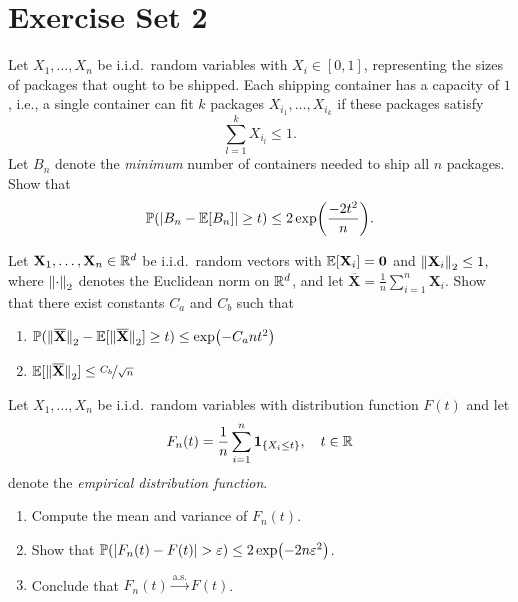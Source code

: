 \section{Exercise Set 2}

\begin{exercise}
Let $X_1, \dots, X_n$ be i.i.d.\ random variables with $X_i \in [0,1]$, representing the sizes of packages that ought to be shipped. Each shipping container has a capacity of $1$, i.e., a single container can fit $k$ packages $X_{i_1}, \dots, X_{i_k}$ if these packages satisfy
\[
    \sum_{l=1}^k X_{i_l} \leq 1.
\]
Let $B_n$ denote the \emph{minimum} number of containers needed to ship all $n$ packages. Show that
\[
    \operatorname{\mathbb{P}}(\abs{B_n - \operatorname{\mathbb{E}}[B_n]} \geq t) \leq 2 \exp(\frac{-2t^2}{n}).
\]
\end{exercise}


\begin{exercise}
Let $\mathbf{X}_1, \dots, \mathbf{X}_n \in \mathbb{R}^d$ be i.i.d.\ random vectors with $\operatorname{\mathbb{E}}[\mathbf{X}_i] = \mathbf{0}$ and $\norm{\mathbf{X}_i}_2 \leq 1$, where $\norm{\cdot}_2$ denotes the Euclidean norm on $\mathbb{R}^d$, and let $\overline{\mathbf{X}} = \frac{1}{n} \sum_{i=1}^n \mathbf{X}_i$. Show that there exist constants $C_a$ and $C_b$ such that
\begin{enumerate}
    \item $\Prob(\norm*{\overline{\mathbf{X}}}_2 - \Exp[\norm*{\overline{\mathbf{X}}}_2] \geq t) \leq \exp(-C_a n t^2)$

    \item $\Exp[\norm*{\overline{\mathbf{X}}}_2] \leq \nicefrac{C_b}{\sqrt{n}}$
\end{enumerate}
\end{exercise}


\begin{exercise}
\label{exer: empirical distribution function}
Let $X_1, \dots, X_n$ be i.i.d.\ random variables with distribution function $F(t)$ and let
\[
    F_n(t) = \frac{1}{n} \sum_{i=1}^n \indSet{X_i \leq t}, \quad t \in \R
\]
denote the \emph{empirical distribution function}.
\begin{enumerate}
    \item Compute the mean and variance of $F_n(t)$.

    \item Show that $\operatorname{\mathbb{P}}(\abs{F_n(t) - F(t)} > \varepsilon) \leq 2 \exp(-2 n \varepsilon^2)$.

    \item Conclude that $F_n(t) \xrightarrow{\mathrm{a.s.}} F(t)$.
\end{enumerate}
\end{exercise}
